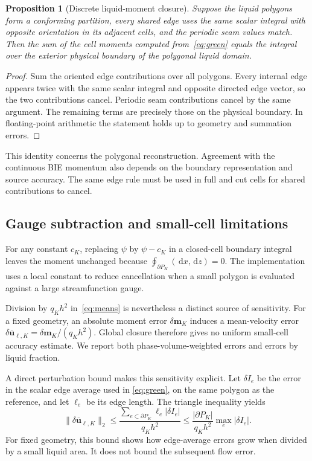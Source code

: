 \documentclass[10pt]{article}
\newcommand{\dd}{\,\mathrm{d}}
\newtheorem{proposition}{Proposition}
\begin{document}
\begin{proposition}[Discrete liquid-moment closure]
Suppose the liquid polygons form a conforming partition, every shared edge
uses the same scalar integral with opposite orientation in its adjacent
cells, and the periodic seam values match. Then the sum of the cell moments
computed from~\eqref{eq:green} equals the integral over the exterior physical
boundary of the polygonal liquid domain.
\end{proposition}
\begin{proof}
Sum the oriented edge contributions over all polygons. Every internal edge
appears twice with the same scalar integral and opposite directed edge
vector, so the two contributions cancel. Periodic seam contributions cancel
by the same argument. The remaining terms are precisely those on the
physical boundary. In floating-point arithmetic the statement holds up to
geometry and summation errors.
\end{proof}

This identity concerns the polygonal reconstruction. Agreement with the
continuous BIE momentum also depends on the boundary representation and
source accuracy. The same edge rule must be used in full and cut cells for
shared contributions to cancel.

\subsection{Gauge subtraction and small-cell limitations}
For any constant $c_K$, replacing $\psi$ by $\psi-c_K$ in a closed-cell
boundary integral leaves the moment unchanged because
$\oint_{\partial P_K}(\dd x,\dd z)=0$. The implementation uses a local
constant to reduce cancellation when a small polygon is evaluated against a
large streamfunction gauge.

Division by $q_Kh^2$ in~\eqref{eq:means} is nevertheless a distinct source of
sensitivity. For a fixed geometry, an absolute moment error $\delta\boldsymbol
m_K$ induces a mean-velocity error
$\delta\overline{\boldsymbol u}_{\ell,K}=\delta\boldsymbol m_K/(q_Kh^2)$.
Global closure therefore gives no uniform small-cell accuracy estimate.
We report both phase-volume-weighted errors and errors by liquid fraction.

A direct perturbation bound makes this sensitivity explicit. Let
$\delta I_e$ be the error in the scalar edge average used in
\eqref{eq:green}, on the same polygon as the reference, and let $\ell_e$
be its edge length. The triangle inequality yields
\begin{equation}
 \|\delta\overline{\boldsymbol u}_{\ell,K}\|_2
 \le \frac{\sum_{e\subset\partial P_K}\ell_e|\delta I_e|}{q_Kh^2}
 \le \frac{|\partial P_K|}{q_Kh^2}\max_e|\delta I_e|.
 \label{eq:sliver-bound}
\end{equation}
For fixed geometry, this bound shows how edge-average errors grow when
divided by a small liquid area. It does not bound the subsequent flow error.
\end{document}
